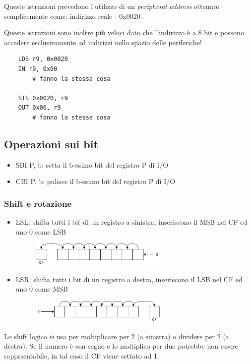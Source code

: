 Queste istruzioni prevedono l'utilizzo di un \emph{peripheral address} ottenuto semplicemente come: indirizzo reale - 0x0020.

Queste istruzioni sono inoltre più veloci dato che l'indirizzo è a 8 bit e possono accedere esclusivamente ad indirizzi nello spazio delle periferiche!

\begin{verbatim}
    LDS r9, 0x0020
    IN r9, 0x00
        # fanno la stessa cosa
        
    STS 0x0020, r9
    OUT 0x00, r9
        # fanno la stessa cosa
\end{verbatim}

\subsection{Operazioni sui bit}
\begin{itemize}
    \item SBI P, b: setta il b-esimo bit del registro P di I/O
    
    \item CBI P, b: pulisce il b-esimo bit del registro P di I/O
\end{itemize}

\subsubsection{Shift e rotazione}
\begin{itemize}
    \item LSL: shifta tutti i bit di un registro a sinistra, inseriscono il MSB nel CF ed uno 0 come LSB
    \begin{figure}[H]
        \centering
        \includegraphics[width=250px]{images/6_Instruction_set/LSL.png}
    \end{figure}
    
    \item LSR: shifta tutti i bit di un registro a destra, inseriscono il LSB nel CF ed uno 0 come MSB
    \begin{figure}[H]
        \centering
        \includegraphics[width=250px]{images/6_Instruction_set/LSR.png}
    \end{figure}
\end{itemize}
Lo shift logico si usa per moltiplicare per 2 (a sinistra) o dividere per 2 (a destra).
Se il numero è con segno e lo moltiplico per due potrebbe non essere rapprsentabile, in tal caso il CF viene settato ad 1.

